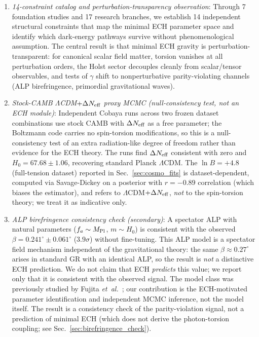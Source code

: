 \documentclass[aps,prd,twocolumn,superscriptaddress,showpacs,preprintnumbers,nofootinbib,longbibliography,floatfix]{revtex4-2}
\newcommand{\MPl}{M_{\rm Pl}}
\newcommand{\Neff}{N_{\rm eff}}
\newcommand{\etal}{\textit{et~al.}}
\begin{document}
\begin{enumerate}[leftmargin=*]
\item \textit{14-constraint catalog and perturbation-transparency observation}: Through 7 foundation studies and 17 research branches, we establish 14 independent structural constraints that map the minimal ECH parameter space and identify which dark-energy pathways survive without phenomenological assumption. The central result is that minimal ECH gravity is perturbation-transparent: for canonical scalar field matter, torsion vanishes at all perturbation orders, the Holst sector decouples cleanly from scalar/tensor observables, and tests of $\gamma$ shift to nonperturbative parity-violating channels (ALP birefringence, primordial gravitational waves).

\item \textit{Stock-CAMB $\Lambda$CDM$+\Delta\Neff$ proxy MCMC (null-consistency test, not an ECH module)}: Independent Cobaya runs across two frozen dataset combinations use stock CAMB with $\Delta\Neff$ as a free parameter; the Boltzmann code carries no spin-torsion modifications, so this is a null-consistency test of an extra radiation-like degree of freedom rather than evidence for the ECH theory. The runs find $\Delta\Neff$ consistent with zero and $H_0 = 67.68 \pm 1.06$, recovering standard Planck $\Lambda$CDM. The $\ln B = +4.8$ (full-tension dataset) reported in Sec.~\ref{sec:cosmo_fits} is dataset-dependent, computed via Savage-Dickey on a posterior with $r=-0.89$ correlation (which biases the estimator), and refers to $\Lambda$CDM$+\Delta\Neff$, \emph{not} to the spin-torsion theory; we treat it as indicative only.

\item \textit{ALP birefringence consistency check (secondary)}: A spectator ALP with natural parameters ($f_a \sim \MPl$, $m \sim H_0$) is consistent with the observed $\beta = 0.241^\circ \pm 0.061^\circ$ ($3.9\sigma$) without fine-tuning. This ALP model is a spectator field mechanism independent of the gravitational theory: the same $\beta \approx 0.27^\circ$ arises in standard GR with an identical ALP, so the result is \emph{not} a distinctive ECH prediction. We do not claim that ECH \emph{predicts} this value; we report only that it is consistent with the observed signal. The model class was previously studied by Fujita \etal~\cite{Fujita2021}; our contribution is the ECH-motivated parameter identification and independent MCMC inference, not the model itself. The result is a consistency check of the parity-violation signal, not a prediction of minimal ECH (which does not derive the photon-torsion coupling; see Sec.~\ref{sec:birefringence_check}).
\end{enumerate}
\end{document}
